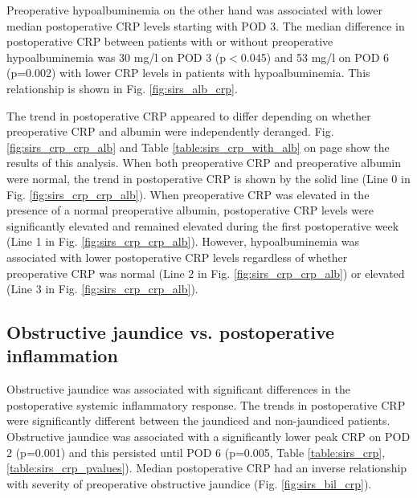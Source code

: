 Preoperative hypoalbuminemia on the other hand was associated with lower median postoperative CRP levels starting with POD 3. 
The median difference in postoperative CRP between patients with or without preoperative hypoalbuminemia was 30 mg/l on POD 3 (p$<$0.045) and 53 mg/l on POD 6 (p=0.002) with lower CRP levels in patients with hypoalbuminemia.
This relationship is shown in Fig. \ref{fig:sirs_alb_crp}.

The trend in postoperative CRP appeared to differ depending on whether preoperative CRP and albumin were independently deranged.
Fig. \ref{fig:sirs_crp_crp_alb} and Table \ref{table:sirs_crp_with_alb} on page \pageref{fig:sirs_crp_crp_alb} show the results of this analysis.
When both preoperative CRP and preoperative albumin were normal, the trend in postoperative CRP is shown by the solid line (Line 0 in Fig. \ref{fig:sirs_crp_crp_alb}). 
When preoperative CRP was elevated in the presence of a normal preoperative albumin, postoperative CRP levels were significantly elevated and remained elevated during the first postoperative week (Line 1 in Fig. \ref{fig:sirs_crp_crp_alb}). 
However, hypoalbuminemia was associated with lower postoperative CRP levels regardless of whether preoperative CRP was normal (Line 2 in Fig. \ref{fig:sirs_crp_crp_alb}) or elevated (Line 3 in Fig. \ref{fig:sirs_crp_crp_alb}). 

\subsection{Obstructive jaundice vs. postoperative inflammation}
Obstructive jaundice was associated with significant differences in the postoperative systemic inflammatory response. 
The trends in postoperative CRP were significantly different between the jaundiced and non-jaundiced patients. 
Obstructive jaundice was associated with a significantly lower peak CRP on POD 2 (p=0.001) and this persisted until POD 6 (p=0.005, Table \ref{table:sirs_crp}, \ref{table:sirs_crp_pvalues}).
Median postoperative CRP had an inverse relationship with severity of preoperative obstructive jaundice (Fig. \ref{fig:sirs_bil_crp}).


